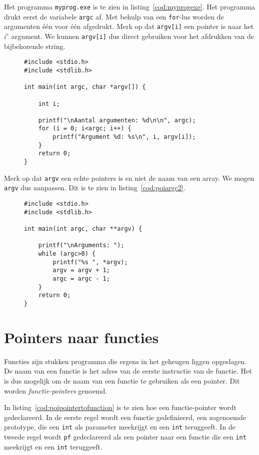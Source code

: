 Het programma \texttt{myprog.exe} is te zien in listing~\ref{cod:myprogexe}. Het
programma drukt eerst de variabele \texttt{argc} af. Met behulp van een \texttt{for}-lus
worden de argumenten \'e\'en voor \'e\'en afgedrukt. Merk op dat \texttt{argv[i]} een
pointer is naar het $i^e$ argument. We kunnen \texttt{argv[i]} dus direct gebruiken
voor het afdrukken van de bijbehorende string.

\begin{figure}[!ht]
\begin{lstlisting}[caption=Het programma myprog.exe.,label=cod:myprogexe]
#include <stdio.h>
#include <stdlib.h>

int main(int argc, char *argv[]) {

    int i;

    printf("\nAantal argumenten: %d\n\n", argc);
    for (i = 0; i<argc; i++) {
        printf("Argument %d: %s\n", i, argv[i]);
    }
    return 0;
}
\end{lstlisting}
\end{figure}

Merk op dat \texttt{argv} een echte pointers is en niet de naam van een array. We mogen \texttt{argv} dus aanpassen. Dit is te zien in listing~\ref{cod:poiargc2}.

\begin{figure}[!ht]
\begin{lstlisting}[caption=Afdrukken van argumenten.,label=cod:poiargc2]
#include <stdio.h>
#include <stdlib.h>

int main(int argc, char **argv) {

    printf("\nArguments: ");
    while (argc>0) {
        printf("%s ", *argv);
        argv = argv + 1;
        argc = argc - 1;
    }
    return 0;
}
\end{lstlisting}
\end{figure}

\section{Pointers naar functies}
\label{sec:pointersnaarfunctie}
Functies zijn stukken programma die ergens in het geheugen liggen opgeslagen. De naam van een functie is het adres van de eerste instructie van de functie. Het is dus mogelijk om de naam van een functie te gebruiken als een pointer. Dit worden \textsl{functie-pointers} genoemd.

In listing~\ref{cod:poipointertofunction} is te zien hoe een functie-pointer wordt gedeclareerd. In de eerste regel wordt een functie gedefinieerd, een zogenoemde prototype, die een \texttt{int} als parameter meekrijgt en een \texttt{int} teruggeeft. In de tweede regel wordt \texttt{pf} gedeclareerd als een pointer naar een functie die een \texttt{int} meekrijgt en een \texttt{int} teruggeeft.

